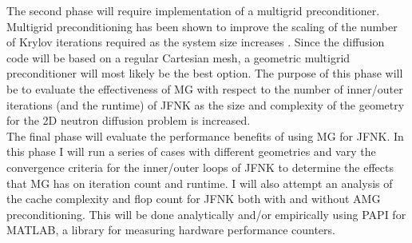 \documentclass{article}
\begin{document}
    The second phase will require implementation of a multigrid preconditioner. Multigrid preconditioning has been shown to improve the scaling of the number of Krylov iterations required as the system size increases \cite{knoll:1999}. Since the diffusion code will be based on a regular Cartesian mesh, a geometric multigrid preconditioner will most likely be the best option. The purpose of this phase will be to evaluate the effectiveness of MG with respect to the number of inner/outer iterations (and the runtime) of JFNK as the size and complexity of the geometry for the 2D neutron diffusion problem is increased. \\

    The final phase will evaluate the performance benefits of using MG for JFNK. In this phase I will run a series of cases with different geometries and vary the convergence criteria for the inner/outer loops of JFNK to determine the effects that MG has on iteration count and runtime. I will also attempt an analysis of the cache complexity and flop count for JFNK both with and without AMG preconditioning. This will be done analytically and/or empirically using PAPI for MATLAB, a library for measuring hardware performance counters.


\end{document}
